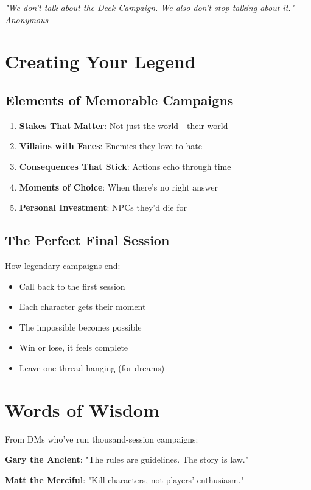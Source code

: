 \documentclass[11pt,letterpaper,openany]{book}
\newcommand{\fantasyquote}[1]{%
\begin{center}
\textit{\large #1}
\end{center}
}
\begin{document}
\fantasyquote{"We don't talk about the Deck Campaign. We also don't stop talking about it." —Anonymous}

\section{Creating Your Legend}

\subsection{Elements of Memorable Campaigns}

\begin{enumerate}
    \item \textbf{Stakes That Matter}: Not just the world—their world
    \item \textbf{Villains with Faces}: Enemies they love to hate
    \item \textbf{Consequences That Stick}: Actions echo through time
    \item \textbf{Moments of Choice}: When there's no right answer
    \item \textbf{Personal Investment}: NPCs they'd die for
\end{enumerate}

\subsection{The Perfect Final Session}

How legendary campaigns end:
\begin{itemize}
    \item Call back to the first session
    \item Each character gets their moment
    \item The impossible becomes possible
    \item Win or lose, it feels complete
    \item Leave one thread hanging (for dreams)
\end{itemize}

\section{Words of Wisdom}

From DMs who've run thousand-session campaigns:

\textbf{Gary the Ancient}: "The rules are guidelines. The story is law."

\textbf{Matt the Merciful}: "Kill characters, not players' enthusiasm."
\end{document}
